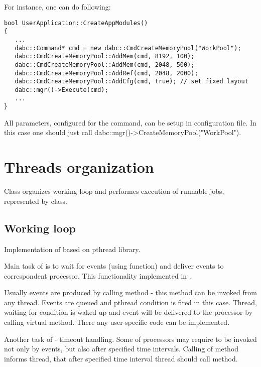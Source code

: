 For instance, one can do following:

\begin{small}
\begin{verbatim}     
bool UserApplication::CreateAppModules()
{
   ...
   dabc::Command* cmd = new dabc::CmdCreateMemoryPool("WorkPool");
   dabc::CmdCreateMemoryPool::AddMem(cmd, 8192, 100);
   dabc::CmdCreateMemoryPool::AddMem(cmd, 2048, 500);
   dabc::CmdCreateMemoryPool::AddRef(cmd, 2048, 2000);
   dabc::CmdCreateMemoryPool::AddCfg(cmd, true); // set fixed layout
   dabc::mgr()->Execute(cmd);
   ...
}
\end{verbatim}     
\end{small}

All parameters, configured for the command, can be setup in configuration file.
In this case one should just call dabc::mgr()->CreateMemoryPool("WorkPool"). 


\section{Threads organization}
\label{prog_services_threads}
Class  organizes working loop and performes execution of
runnable jobs, represented by  class.


\subsection{Working loop}

Implementation of  based on pthread library.
 
Main task of  is to wait for events (using  function)
and deliver events to correspondent processor. This functionality implemented 
in .
 
Usually events are produced by calling  
method - this method can be invoked from any thread. Events are queued and 
pthread condition is fired in this case. Thread, waiting for condition is waked up and
event will be delivered to the processor by calling  
virtual method. There any user-specific code can be implemented.

Another task of  - timeout handling. Some of processors 
may require to be invoked not only by events, but also after specified time intervals.
Calling of method  informs thread, that after
specified time interval thread should call  method.  
 

